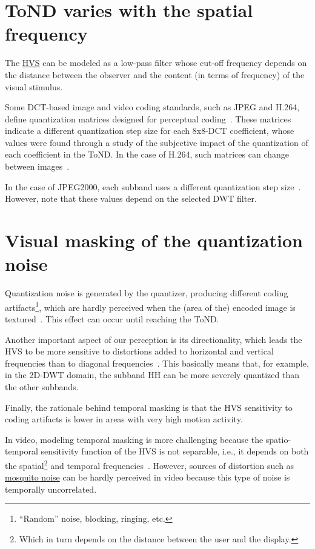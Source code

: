 \section{ToND varies with the spatial frequency}
The
\href{https://en.wikipedia.org/wiki/Human_visual_system_model}{HVS}
can be modeled as a low-pass filter whose cut-off frequency depends on
the distance between the observer and the content (in terms of
frequency) of the visual stimulus.

Some DCT-based image and video coding standards, such as JPEG and
H.264, define quantization matrices designed for perceptual
coding~\cite{ernawan2014optimal}. These matrices indicate a different
quantization step size for each 8x8-DCT coefficient, whose values were
found through a study of the subjective impact of the quantization of
each coefficient in the ToND. In the case of H.264, such matrices can
change between images~\cite{naccari2014perceptually}.

In the case of JPEG2000, each subband uses a different quantization
step size~\cite{liu2020visibility}. However, note that these values
depend on the selected DWT filter.

\section{Visual masking of the quantization noise}

Quantization noise is generated by the quantizer, producing
different coding artifacts\footnote{``Random'' noise, blocking,
  ringing, etc.}, which are hardly perceived when the (area of the)
encoded image is textured~\cite{wu2017digital}. This effect can
occur until reaching the ToND.

Another important aspect of our perception is its directionality,
which leads the HVS to be more sensitive to distortions added to
horizontal and vertical frequencies than to diagonal
frequencies~\cite{naccari2014perceptually}. This basically means that,
for example, in the 2D-DWT domain, the subband HH can be more
severely quantized than the other subbands.

Finally, the rationale behind temporal masking is that the HVS
sensitivity to coding artifacts is lower in areas with very high
motion activity.

In video, modeling temporal masking is more challenging because the
spatio-temporal sensitivity function of the HVS is not separable,
i.e., it depends on both the spatial\footnote{Which in turn depends on
  the distance between the user and the display.} and temporal
frequencies~\cite{naccari2014perceptually}. However, sources of
distortion such as
\href{https://en.wikipedia.org/wiki/Compression_artifact#Mosquito_noise}{mosquito
  noise} can be hardly perceived in video because this type of noise
is temporally uncorrelated.

